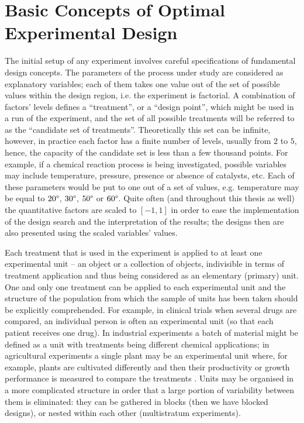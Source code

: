 \section{Basic Concepts of Optimal Experimental Design}
The initial setup of any experiment involves careful specifications of fundamental design concepts. The parameters of the process under study are considered as explanatory variables; each of them takes one value out of the set of possible values within the design region, i.e. the experiment is factorial. A combination of factors' levels defines a ``treatment'', or a ``design point'',  which might be used in a run of the experiment, and the set of all possible treatments will be referred to as the ``candidate set of treatments''. Theoretically this set can be infinite, however, in practice each factor has a finite number of levels, usually from $2$ to $5$, hence, the capacity of the candidate set is less than a few thousand points. For example, if a chemical reaction process is being investigated, possible variables may include temperature, pressure, presence or absence of catalysts, etc. Each of these parameters would be put to one out of a set of values, e.g. temperature may be equal to $20\degree$, $30\degree$, $50\degree$ or $60\degree$. Quite often (and throughout this thesis as well) the quantitative factors are scaled to $[-1,1]$ in order to ease the implementation of the design search and the interpretation of the results; the designs then are also presented using the scaled variables' values.

Each treatment that is used in the experiment is applied to at least one experimental unit -- an object or a collection of objects, indivisible in terms of treatment application and thus being considered as an elementary (primary) unit. One and only one treatment can be applied to each experimental unit and the structure of the population from which the sample of units has been taken should be explicitly comprehended. For example, in clinical trials when several drugs are compared, an individual person is often an experimental unit (so that each patient receives one drug). In industrial experiments a batch of material might be defined as a unit with treatments being different chemical applications; in agricultural experiments a single plant may be an experimental unit where, for example, plants are cultivated differently and then their productivity or growth performance is measured to compare the treatments \citep{MeadGilmour2012}. Units may be organised in a more complicated structure in order that a large portion of variability between them is eliminated: they can be gathered in blocks (then we have blocked designs), or nested within each other (multistratum experiments).

